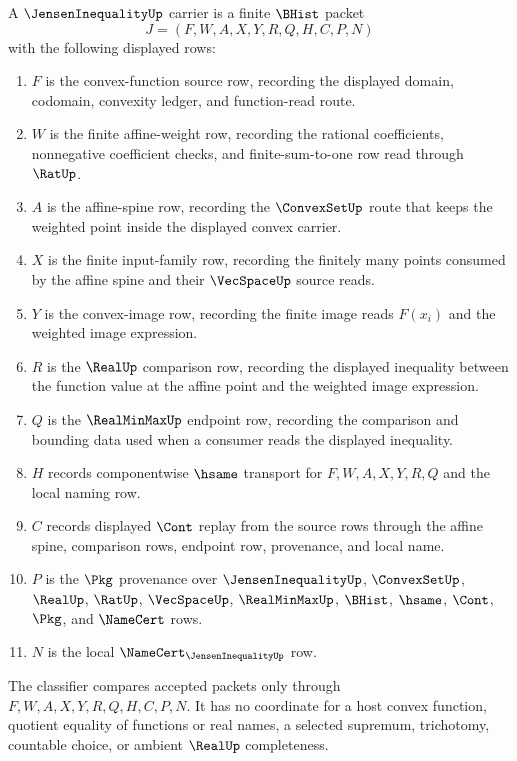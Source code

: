 \begin{definition}
\label{def:jensen-inequality-carrier}
A $\JensenInequalityUp$ carrier is a finite $\BHist$ packet
$$
J=(F,W,A,X,Y,R,Q,H,C,P,N)
$$
with the following displayed rows:
\begin{enumerate}
\item $F$ is the convex-function source row, recording the displayed domain, codomain, convexity ledger, and function-read route.
\item $W$ is the finite affine-weight row, recording the rational coefficients, nonnegative coefficient checks, and finite-sum-to-one row read through $\RatUp$.
\item $A$ is the affine-spine row, recording the $\ConvexSetUp$ route that keeps the weighted point inside the displayed convex carrier.
\item $X$ is the finite input-family row, recording the finitely many points consumed by the affine spine and their $\VecSpaceUp$ source reads.
\item $Y$ is the convex-image row, recording the finite image reads $F(x_i)$ and the weighted image expression.
\item $R$ is the $\RealUp$ comparison row, recording the displayed inequality between the function value at the affine point and the weighted image expression.
\item $Q$ is the $\RealMinMaxUp$ endpoint row, recording the comparison and bounding data used when a consumer reads the displayed inequality.
\item $H$ records componentwise $\hsame$ transport for $F,W,A,X,Y,R,Q$ and the local naming row.
\item $C$ records displayed $\Cont$ replay from the source rows through the affine spine, comparison rows, endpoint row, provenance, and local name.
\item $P$ is the $\Pkg$ provenance over $\JensenInequalityUp$, $\ConvexSetUp$, $\RealUp$, $\RatUp$, $\VecSpaceUp$, $\RealMinMaxUp$, $\BHist$, $\hsame$, $\Cont$, $\Pkg$, and $\NameCert$ rows.
\item $N$ is the local $\NameCert_{\JensenInequalityUp}$ row.
\end{enumerate}
The classifier compares accepted packets only through $F,W,A,X,Y,R,Q,H,C,P,N$. It has no coordinate for a host convex function, quotient equality of functions or real names, a selected supremum, trichotomy, countable choice, or ambient $\RealUp$ completeness.
\end{definition}

